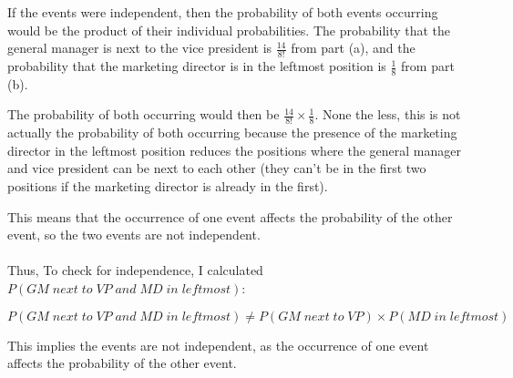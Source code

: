 \documentclass{amsart}
\theoremstyle{definition}
\theoremstyle{Exercise}
\theoremstyle{remark}
\theoremstyle{rule}
\numberwithin{equation}{section}
\begin{document}
\begin{enumerate}[label=(\alph*)]
If the events were independent, then the probability of both events occurring would be the product of their individual probabilities. The probability that the general manager is next to the vice president is \( \frac{14}{8!} \) from part (a), and the probability that the marketing director is in the leftmost position is \( \frac{1}{8} \) from part (b).

The probability of both occurring would then be \( \frac{14}{8!} \times \frac{1}{8} \). None the less, this is not actually the probability of both occurring because the presence of the marketing director in the leftmost position reduces the positions where the general manager and vice president can be next to each other (they can't be in the first two positions if the marketing director is already in the first).

This means that the occurrence of one event affects the probability of the other event, so the two events are not independent.\\\\
Thus, To check for independence, I calculated \( P(GM \; next \; to \; VP \; and \; MD \; in \; leftmost) \):

\[ P(GM \; next \; to \; VP \; and \; MD \; in \; leftmost) \neq P(GM \; next \; to \; VP) \times P(MD \; in \; leftmost) \]

This implies the events are not independent, as the occurrence of one event affects the probability of the other event.
\end{enumerate}
\end{document}
